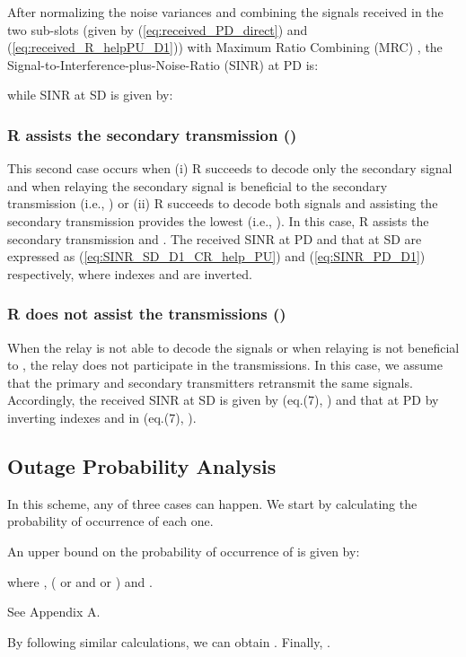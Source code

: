 \documentclass[conference,twocolumn]{IEEEtran}
\begin{document}
After normalizing the noise variances and combining the signals received in the two sub-slots (given by
(\ref{eq:received_PD_direct}) and (\ref{eq:received_R_helpPU_D1}))
with Maximum Ratio Combining (MRC) \cite{Yang_2009}, the
Signal-to-Interference-plus-Noise-Ratio (SINR) at PD is:

while SINR at SD is given by:


\subsubsection{R assists the secondary transmission ()}

This second case occurs when (i) R succeeds to decode only the secondary signal and when relaying the secondary signal is beneficial to the secondary transmission (i.e., ) or (ii) R succeeds to decode both signals and assisting the secondary transmission provides the lowest (i.e., ). In this case, R assists the secondary transmission and . The received SINR at PD and that at SD are expressed as (\ref{eq:SINR_SD_D1_CR_help_PU}) and (\ref{eq:SINR_PD_D1}) respectively, where indexes  and  are inverted.
\subsubsection{R does not assist the transmissions ()}

When the relay is not able to decode the signals or when relaying is not beneficial to , the relay does not participate in the transmissions. In this case, we assume that the primary and secondary transmitters retransmit the same signals. Accordingly, the received SINR at SD is given by (eq.(7), \cite{Jaafar_Globecom}) and that at PD by inverting indexes  and  in (eq.(7), \cite{Jaafar_Globecom}).


\subsection{Outage Probability Analysis}
In this scheme, any of three cases can happen. We start by calculating the probability of occurrence of each one.

An upper bound on the probability of occurrence of  is given by:

where ,  ( or  and  or ) and  .


\begin{IEEEproof}
See Appendix A.
\end{IEEEproof}
By following similar calculations, we can obtain .
Finally, .
\end{document}

